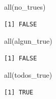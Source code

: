 \documentclass[
  ignorenonframetext,
  aspectratio=169,
  spanish,
]{beamer}
\newenvironment{Shaded}{\begin{snugshade}}{\end{snugshade}}
\newcommand{\FunctionTok}[1]{\textcolor[rgb]{0.28,0.35,0.67}{#1}}
\newcommand{\NormalTok}[1]{\textcolor[rgb]{0.00,0.23,0.31}{#1}}
\begin{document}
\begin{frame}[fragile]{}
\label{section-13}
\begin{Shaded}
\begin{Highlighting}[]
\FunctionTok{all}\NormalTok{(no\_trues) }
\end{Highlighting}
\end{Shaded}

\begin{verbatim}
[1] FALSE
\end{verbatim}

\begin{Shaded}
\begin{Highlighting}[]
\FunctionTok{all}\NormalTok{(algun\_true)}
\end{Highlighting}
\end{Shaded}

\begin{verbatim}
[1] FALSE
\end{verbatim}

\begin{Shaded}
\begin{Highlighting}[]
\FunctionTok{all}\NormalTok{(todos\_true)  }
\end{Highlighting}
\end{Shaded}

\begin{verbatim}
[1] TRUE
\end{verbatim}
\end{frame}
\end{document}
